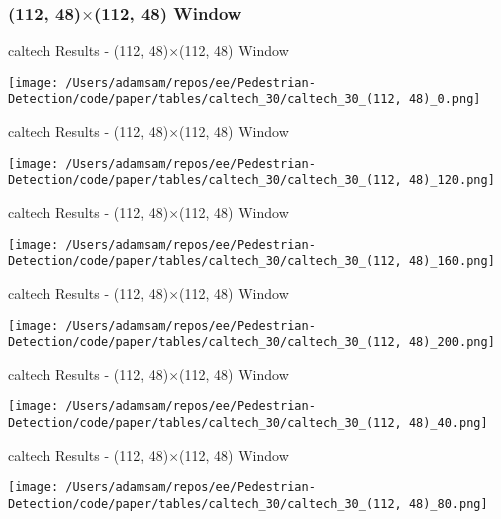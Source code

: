 \subsubsection*{(112, 48)$\times$(112, 48) Window}

\begin{table}
    \caption{caltech Results - (112, 48)$\times$(112, 48) Window}
    \texttt{[image: /Users/adamsam/repos/ee/Pedestrian-Detection/code/paper/tables/caltech\_30/caltech\_30\_(112, 48)\_0.png]}
    \label{tab:caltech_30_(112, 48)_0}
\end{table}

\begin{table}
    \caption{caltech Results - (112, 48)$\times$(112, 48) Window}
    \texttt{[image: /Users/adamsam/repos/ee/Pedestrian-Detection/code/paper/tables/caltech\_30/caltech\_30\_(112, 48)\_120.png]}
    \label{tab:caltech_30_(112, 48)_120}
\end{table}

\begin{table}
    \caption{caltech Results - (112, 48)$\times$(112, 48) Window}
    \texttt{[image: /Users/adamsam/repos/ee/Pedestrian-Detection/code/paper/tables/caltech\_30/caltech\_30\_(112, 48)\_160.png]}
    \label{tab:caltech_30_(112, 48)_160}
\end{table}

\begin{table}
    \caption{caltech Results - (112, 48)$\times$(112, 48) Window}
    \texttt{[image: /Users/adamsam/repos/ee/Pedestrian-Detection/code/paper/tables/caltech\_30/caltech\_30\_(112, 48)\_200.png]}
    \label{tab:caltech_30_(112, 48)_200}
\end{table}

\begin{table}
    \caption{caltech Results - (112, 48)$\times$(112, 48) Window}
    \texttt{[image: /Users/adamsam/repos/ee/Pedestrian-Detection/code/paper/tables/caltech\_30/caltech\_30\_(112, 48)\_40.png]}
    \label{tab:caltech_30_(112, 48)_40}
\end{table}

\begin{table}
    \caption{caltech Results - (112, 48)$\times$(112, 48) Window}
    \texttt{[image: /Users/adamsam/repos/ee/Pedestrian-Detection/code/paper/tables/caltech\_30/caltech\_30\_(112, 48)\_80.png]}
    \label{tab:caltech_30_(112, 48)_80}
\end{table}


